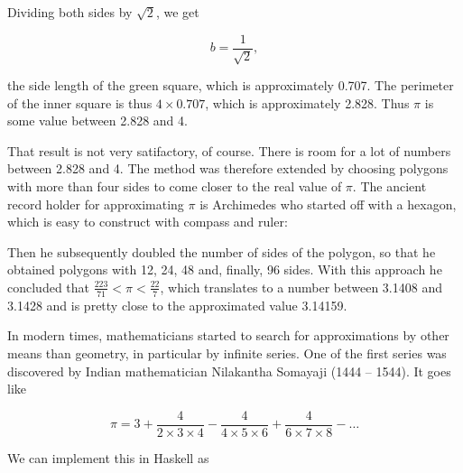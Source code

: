 \documentclass[tikz]{scrreprt}
\begin{document}
Dividing both sides by $\sqrt{2}$, 
we get 

\begin{equation}
b = \frac{1}{\sqrt{2}},
\end{equation}

the side length of the green square, which is
approximately 0.707. The perimeter of
the inner square is thus $4 \times 0.707$,
which is approximately 2.828.
Thus $\pi$ is some value between 2.828 and 4.

That result is not very satifactory, of course.
There is room for a lot of numbers between
2.828 and 4. The method was therefore extended
by choosing polygons with more than four sides
to come closer to the real value of $\pi$.
The ancient record holder for approximating $\pi$
is Archimedes who started off with a hexagon,
which is easy to construct with compass and ruler:

\begin{center}
\end{center}

Then he subsequently doubled the number of sides
of the polygon, so that he obtained polygons with
12, 24, 48 and, finally, 96 sides. With this approach
he concluded that $\frac{223}{71} < \pi < \frac{22}{7}$,
which translates to a number between 3.1408 and 3.1428
and is pretty close to the approximated value 3.14159.

In modern times, mathematicians started to search
for approximations by other means than geometry,
in particular by infinite series. One of the first series
was discovered by Indian mathematician Nilakantha Somayaji
(1444 -- 1544). It goes like

\begin{equation}
  \pi = 3 + \frac{4}{2\times 3 \times 4} -
            \frac{4}{4\times 5 \times 6} +
            \frac{4}{6\times 7 \times 8} -
            \dots
\end{equation}

We can implement this in Haskell as
\end{document}

